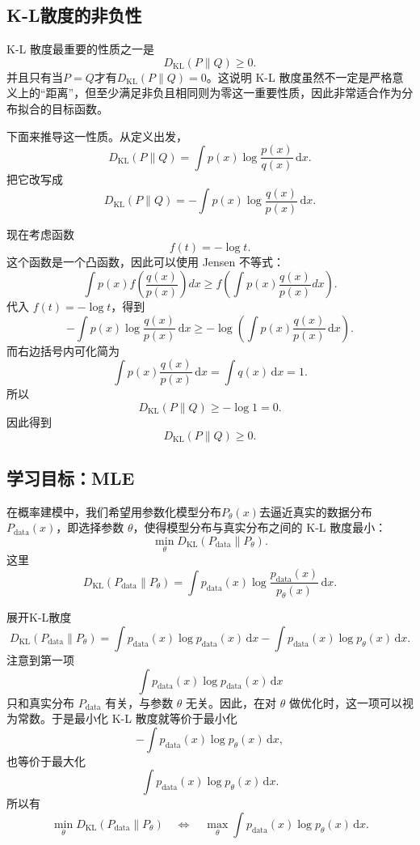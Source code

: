 \subsection{K-L散度的非负性}

K-L 散度最重要的性质之一是
\[
D_{\mathrm{KL}}(P\|Q)\ge 0.
\]
并且只有当\(P=Q\)才有\(D_{\mathrm{KL}}(P\|Q)=0\)。这说明 K-L 散度虽然不一定是严格意义上的``距离''，但至少满足非负且相同则为零这一重要性质，因此非常适合作为分布拟合的目标函数。

下面来推导这一性质。从定义出发，
\[
D_{\mathrm{KL}}(P\|Q)=\int p(x)\log\frac{p(x)}{q(x)}\,\mathrm{d}x.
\]
把它改写成
\[
D_{\mathrm{KL}}(P\|Q)=-\int p(x)\log\frac{q(x)}{p(x)}\,\mathrm{d}x.
\]

现在考虑函数
\[
f(t)=-\log t.
\]
这个函数是一个凸函数，因此可以使用 Jensen 不等式：
\[
\int p(x)f\left(\frac{q(x)}{p(x)}\right)dx
\ge
f\left(\int p(x)\frac{q(x)}{p(x)}dx\right).
\]
代入 \(f(t)=-\log t\)，得到
\[
-\int p(x)\log\frac{q(x)}{p(x)}\,\mathrm{d}x
\ge
-\log\left(\int p(x)\frac{q(x)}{p(x)}\,\mathrm{d}x\right).
\]
而右边括号内可化简为
\[
\int p(x)\frac{q(x)}{p(x)}\,\mathrm{d}x
=
\int q(x)\,\mathrm{d}x
=1.
\]
所以
\[
D_{\mathrm{KL}}(P\|Q)\ge -\log 1=0.
\]
因此得到
\[
D_{\mathrm{KL}}(P\|Q)\ge 0.
\]

\subsection{学习目标：MLE}

在概率建模中，我们希望用参数化模型分布\(P_\theta(x)\)去逼近真实的数据分布\(P_{\mathrm{data}}(x)\)，即选择参数 \(\theta\)，使得模型分布与真实分布之间的 K-L 散度最小：
\[
\min_\theta D_{\mathrm{KL}}(P_{\mathrm{data}}\|P_\theta).
\]
这里
\[
D_{\mathrm{KL}}(P_{\mathrm{data}}\|P_\theta)
=
\int p_{\mathrm{data}}(x)\log\frac{p_{\mathrm{data}}(x)}{p_\theta(x)}\,\mathrm{d}x.
\]

展开K-L散度
\[
D_{\mathrm{KL}}(P_{\mathrm{data}}\|P_\theta)
=
\int p_{\mathrm{data}}(x)\log p_{\mathrm{data}}(x)\,\mathrm{d}x
-
\int p_{\mathrm{data}}(x)\log p_\theta(x)\,\mathrm{d}x.
\]
注意到第一项
\[
\int p_{\mathrm{data}}(x)\log p_{\mathrm{data}}(x)\,\mathrm{d}x
\]
只和真实分布 \(P_{\mathrm{data}}\) 有关，与参数 \(\theta\) 无关。因此，在对 \(\theta\) 做优化时，这一项可以视为常数。于是最小化 K-L 散度就等价于最小化
\[
-\int p_{\mathrm{data}}(x)\log p_\theta(x)\,\mathrm{d}x,
\]
也等价于最大化
\[
\int p_{\mathrm{data}}(x)\log p_\theta(x)\,\mathrm{d}x.
\]
所以有
\[
\min_\theta D_{\mathrm{KL}}(P_{\mathrm{data}}\|P_\theta)
\quad\Longleftrightarrow\quad
\max_\theta \int p_{\mathrm{data}}(x)\log p_\theta(x)\,\mathrm{d}x.
\]

